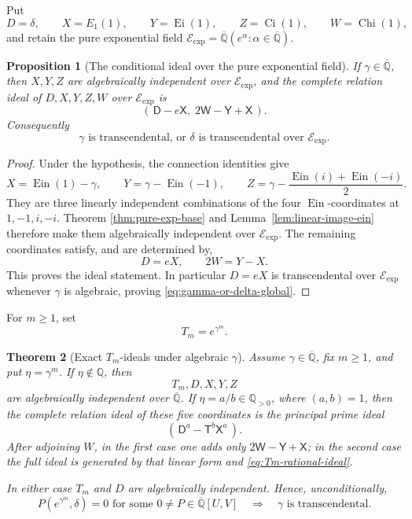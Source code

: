 \documentclass[11pt]{article}
\newtheorem{theorem}{Theorem}[section]
\newtheorem{proposition}[theorem]{Proposition}
\theoremstyle{definition}
\theoremstyle{remark}
\newcommand{\Q}{\mathbb Q}
\newcommand{\Qbar}{\overline{\mathbb Q}}
\newcommand{\Ein}{\operatorname{Ein}}
\newcommand{\Ei}{\operatorname{Ei}}
\newcommand{\Ci}{\operatorname{Ci}}
\newcommand{\Chi}{\operatorname{Chi}}
\newcommand{\Eexp}{\mathcal E_{\mathrm{exp}}}
\begin{document}
Put
\[
 D=\delta,\qquad X=E_1(1),\qquad Y=\Ei(1),\qquad
 Z=\Ci(1),\qquad W=\Chi(1),
\]
and retain the pure exponential field
\(\Eexp=\Qbar(e^\alpha:\alpha\in\Qbar)\).

\begin{proposition}[The conditional ideal over the pure exponential field]
\label{prop:conditional-pure-exp-ideal}
If \(\gamma\in\Qbar\), then \(X,Y,Z\) are algebraically independent over
\(\Eexp\), and the complete relation ideal of \(D,X,Y,Z,W\) over
\(\Eexp\) is
\begin{equation}\label{eq:conditional-pure-exp-ideal}
 (\,\mathsf D-e\mathsf X,\;2\mathsf W-\mathsf Y+\mathsf X\,).
\end{equation}
Consequently
\begin{equation}\label{eq:gamma-or-delta-global}
 \boxed{\ \gamma\text{ is transcendental, or }
 \delta\text{ is transcendental over }\Eexp.\ }
\end{equation}
\end{proposition}

\begin{proof}
Under the hypothesis, the connection identities give
\[
 X=\Ein(1)-\gamma,\qquad
 Y=\gamma-\Ein(-1),\qquad
 Z=\gamma-\frac{\Ein(i)+\Ein(-i)}2.
\]
They are three linearly independent combinations of the four
\(\Ein\)-coordinates at \(1,-1,i,-i\).  Theorem
\ref{thm:pure-exp-base} and Lemma~\ref{lem:linear-image-ein} therefore make
them algebraically independent over \(\Eexp\).  The remaining coordinates
satisfy, and are determined by,
\[
 D=eX,\qquad 2W=Y-X.
\]
This proves the ideal statement.  In particular \(D=eX\) is transcendental
over \(\Eexp\) whenever \(\gamma\) is algebraic, proving
\eqref{eq:gamma-or-delta-global}.
\end{proof}

For \(m\ge1\), set
\[
 T_m=e^{\gamma^m}.
\]

\begin{theorem}[Exact \(T_m\)-ideals under algebraic \(\gamma\)]
\label{thm:Tm-exact-ideals}
Assume \(\gamma\in\Qbar\), fix \(m\ge1\), and put
\(\eta=\gamma^m\).  If \(\eta\notin\Q\), then
\[
 T_m,D,X,Y,Z
\]
are algebraically independent over \(\Qbar\).  If
\(\eta=a/b\in\Q_{>0}\), where \((a,b)=1\), then the complete relation
ideal of these five coordinates is the principal prime ideal
\begin{equation}\label{eq:Tm-rational-ideal}
 (\,\mathsf D^a-\mathsf T^b\mathsf X^a\,).
\end{equation}
After adjoining \(W\), in the first case one adds only
\(2\mathsf W-\mathsf Y+\mathsf X\); in the second case the full ideal is
generated by that linear form and \eqref{eq:Tm-rational-ideal}.

In either case \(T_m\) and \(D\) are algebraically independent.  Hence,
unconditionally,
\begin{equation}\label{eq:Tm-delta-detector}
 \boxed{\ P(e^{\gamma^m},\delta)=0\text{ for some }
 0\ne P\in\Qbar[U,V]\quad\Longrightarrow\quad
 \gamma\text{ is transcendental}.\ }
\end{equation}
\end{theorem}
\end{document}

